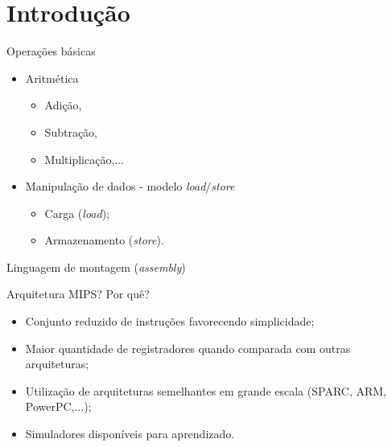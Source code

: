 

\lecturetitle{\insertlecture}{\course}

\frame{\maketitle}

\section{Introdução}




\begin{frame}{\insertlecture}
 \begin{block}{Operações básicas}
  \begin{itemize}
  \item Aritmética
    \begin{itemize}
    \item Adição,
    \item Subtração,
    \item Multiplicação,...
    \end{itemize}
  \item Manipulação de dados - modelo {\em load$\slash$store}
    \begin{itemize}
    \item Carga ({\em load});
    \item Armazenamento ({\em store}). 
    \end{itemize}
  \end{itemize}
\end{block}
\end{frame}

\begin{frame}{Linguagem de montagem ({\em assembly})}
  
  \begin{block}{Arquitetura MIPS? Por quê?}
    \begin{itemize}
    \item Conjunto reduzido de instruções favorecendo simplicidade;
    \item Maior quantidade de registradores quando comparada com
      outras arquiteturas;
    \item Utilização de arquiteturas semelhantes em grande escala
      (SPARC, ARM, PowerPC,...);
    \item Simuladores disponíveis para aprendizado.
    \end{itemize}
  \end{block}
\end{frame}

